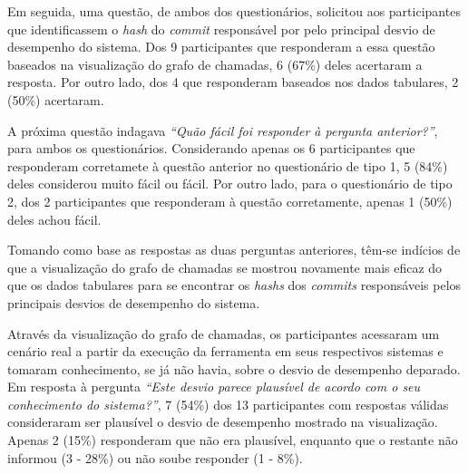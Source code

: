 
Em seguida, uma questão, de ambos dos questionários, solicitou aos participantes que identificassem o \textit{hash} do \textit{commit} responsável por pelo principal desvio de desempenho do sistema. Dos 9 participantes que responderam a essa questão baseados na visualização do grafo de chamadas, 6 (67\%) deles acertaram a resposta. Por outro lado, dos 4 que responderam baseados nos dados tabulares, 2 (50\%) acertaram.

A próxima questão indagava \textit{``Quão fácil foi responder à pergunta anterior?''}, para ambos os questionários. Considerando apenas os 6 participantes que responderam corretamete à questão anterior no questionário de tipo 1, 5 (84\%) deles considerou muito fácil ou fácil. Por outro lado, para o questionário de tipo 2, dos 2 participantes que responderam à questão corretamente, apenas 1 (50\%) deles achou fácil.

\begin{framed}
  \noindent Tomando como base as respostas as duas perguntas anteriores, têm-se indícios de que a visualização do grafo de chamadas se mostrou novamente mais eficaz do que os dados tabulares para se encontrar os \textit{hashs} dos \textit{commits} responsáveis pelos principais desvios de desempenho do sistema.
\end{framed}

Através da visualização do grafo de chamadas, os participantes acessaram um cenário real a partir da execução da ferramenta em seus respectivos sistemas e tomaram conhecimento, se já não havia, sobre o desvio de desempenho deparado. Em resposta à pergunta \textit{``Este desvio parece plausível de acordo com o seu conhecimento do sistema?''}, 7 (54\%) dos 13 participantes com respostas válidas consideraram ser plausível o desvio de desempenho mostrado na visualização. Apenas 2 (15\%) responderam que não era plausível, enquanto que o restante não informou (3 - 28\%) ou não soube responder (1 - 8\%).

